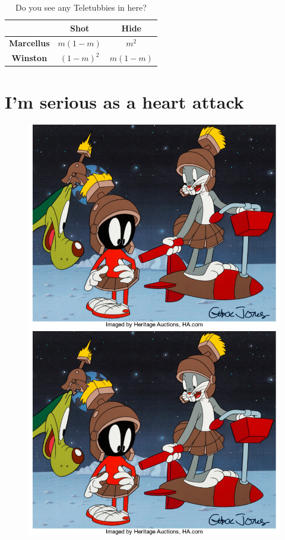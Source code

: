 \documentclass[a4paper, 11pt]{article}
\begin{document}
\begin{table}
 \centering
 \begin{tabular}{|c|c|c|}
  \hline
  & \textbf{Shot} & \textbf{Hide}\\\hline
  \textbf{Marcellus} & $m(1 - m)$ & $m^2$\\
  \textbf{Winston} & $(1 - m)^2$ & $m(1 - m)$\\\hline
 \end{tabular}
 \caption{Do you see any Teletubbies in here?}
 \label{tab::tubbies}
\end{table}

\section{I'm serious as a heart attack} 

\begin{figure}[ht!]
  \begin{minipage}[c]{.49\linewidth}
   \centering
   \includegraphics[width=\linewidth]{picture.jpg}
  \end{minipage} \hfill
  \begin{minipage}[c]{.49\linewidth}
   \centering
   \includegraphics[width=\linewidth]{picture.jpg}

\end{minipage}
\end{figure}
\end{document}
